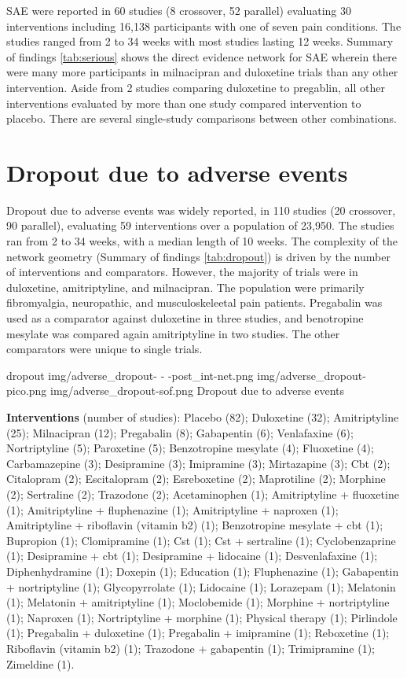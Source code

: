 \documentclass{report}\usepackage[]{graphicx}\usepackage[]{color}
\begin{document}
SAE were reported in 60 studies (8 crossover, 52 parallel) evaluating 30 interventions including 16,138 participants with one of seven pain conditions. The studies ranged from  2 to 34 weeks with most studies lasting 12 weeks. Summary of findings \ref{tab:serious} shows the direct evidence network for SAE wherein there were many more participants in milnacipran and duloxetine trials than any other intervention. Aside from 2 studies comparing duloxetine to pregablin, all other interventions evaluated by more than one study compared intervention  to placebo. There are several single-study comparisons between other combinations.


\section{Dropout due to adverse events}

Dropout due to adverse events was widely reported, in 110 studies (20 crossover, 90 parallel), evaluating 59 interventions over a population of 23,950. The studies ran from 2 to 34 weeks, with a median length of 10 weeks. The complexity of the network geometry (Summary of findings \ref{tab:dropout}) is driven by the number of interventions and comparators. However, the majority of trials were in duloxetine, amitriptyline, and milnacipran. The population were primarily fibromyalgia, neuropathic, and musculoskeleetal pain patients. Pregabalin was used as a comparator against duloxetine in three studies, and benotropine mesylate was compared again amitriptyline in two studies. The other comparators were unique to single trials.

\soffignew
{dropout}
{img/adverse_dropout- - -post_int-net.png}
{img/adverse_dropout-pico.png}
{img/adverse_dropout-sof.png}
{Dropout due to adverse events}

\textbf{Interventions} (number of studies): Placebo (82); Duloxetine (32); Amitriptyline (25); Milnacipran (12); Pregabalin (8); Gabapentin (6); Venlafaxine (6); Nortriptyline (5); Paroxetine (5); Benzotropine mesylate (4); Fluoxetine (4); Carbamazepine (3); Desipramine (3); Imipramine (3); Mirtazapine (3); Cbt (2); Citalopram (2); Escitalopram (2); Esreboxetine (2); Maprotiline (2); Morphine (2); Sertraline (2); Trazodone (2); Acetaminophen (1); Amitriptyline + fluoxetine (1); Amitriptyline + fluphenazine (1); Amitriptyline + naproxen (1); Amitriptyline + riboflavin (vitamin b2) (1); Benzotropine mesylate + cbt (1); Bupropion (1); Clomipramine (1); Cst (1); Cst + sertraline (1); Cyclobenzaprine (1); Desipramine + cbt (1); Desipramine + lidocaine (1); Desvenlafaxine (1); Diphenhydramine (1); Doxepin (1); Education (1); Fluphenazine (1); Gabapentin + nortriptyline (1); Glycopyrrolate (1); Lidocaine (1); Lorazepam (1); Melatonin (1); Melatonin + amitriptyline (1); Moclobemide (1); Morphine + nortriptyline (1); Naproxen (1); Nortriptyline + morphine (1); Physical therapy (1); Pirlindole (1); Pregabalin + duloxetine (1); Pregabalin + imipramine (1); Reboxetine (1); Riboflavin (vitamin b2) (1); Trazodone + gabapentin (1); Trimipramine (1); Zimeldine (1).
\end{document}
